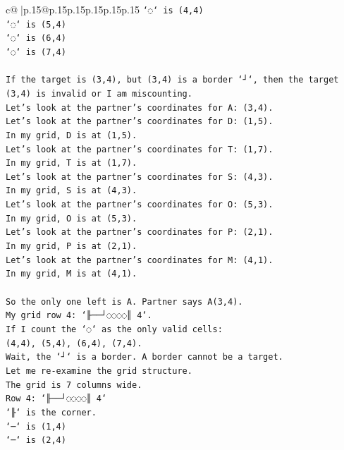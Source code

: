 \documentclass{article}
\begin{document}
{\begin{supertabular}{c@{$\;$}|p{.15\linewidth}@{}p{.15\linewidth}p{.15\linewidth}p{.15\linewidth}p{.15\linewidth}p{.15\linewidth}}
{{{\texttt{`◌` is (4,4)} \\
\texttt{`◌` is (5,4)} \\
\texttt{`◌` is (6,4)} \\
\texttt{`◌` is (7,4)} \\
\\ 
\texttt{If the target is (3,4), but (3,4) is a border `┘`, then the target (3,4) is invalid or I am miscounting.} \\
\texttt{Let's look at the partner's coordinates for A: (3,4).} \\
\texttt{Let's look at the partner's coordinates for D: (1,5).} \\
\texttt{In my grid, D is at (1,5).} \\
\texttt{Let's look at the partner's coordinates for T: (1,7).} \\
\texttt{In my grid, T is at (1,7).} \\
\texttt{Let's look at the partner's coordinates for S: (4,3).} \\
\texttt{In my grid, S is at (4,3).} \\
\texttt{Let's look at the partner's coordinates for O: (5,3).} \\
\texttt{In my grid, O is at (5,3).} \\
\texttt{Let's look at the partner's coordinates for P: (2,1).} \\
\texttt{In my grid, P is at (2,1).} \\
\texttt{Let's look at the partner's coordinates for M: (4,1).} \\
\texttt{In my grid, M is at (4,1).} \\
\\ 
\texttt{So the only one left is A. Partner says A(3,4).} \\
\texttt{My grid row 4: `╟──┘◌◌◌◌║ 4`.} \\
\texttt{If I count the `◌` as the only valid cells:} \\
\texttt{(4,4), (5,4), (6,4), (7,4).} \\
\texttt{Wait, the `┘` is a border. A border cannot be a target.} \\
\texttt{Let me re{-}examine the grid structure.} \\
\texttt{The grid is 7 columns wide.} \\
\texttt{Row 4: `╟──┘◌◌◌◌║ 4`} \\
\texttt{`╟` is the corner.} \\
\texttt{`─` is (1,4)} \\
\texttt{`─` is (2,4)} \\
}}}
\end{supertabular}}
\end{document}
